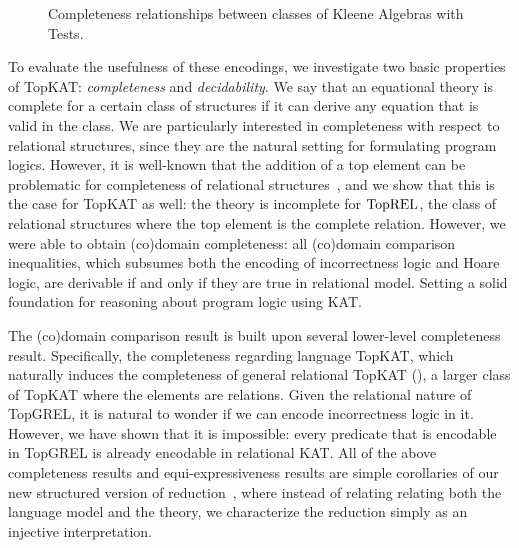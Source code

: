 
\begin{figure}
    \centering
    \caption{Completeness relationships between classes of Kleene Algebras with Tests.}\label{fig:completeness}
\end{figure}

To evaluate the usefulness of these encodings, we investigate two basic
properties of TopKAT\@: \emph{completeness} and \emph{decidability}.  We say
that an equational theory is complete for a certain class of structures if it
can derive any equation that is valid in the class.  We are particularly
interested in completeness with respect to relational structures, since they are
the natural setting for formulating program logics. 
However, it is well-known that the addition of a top element can be problematic for completeness of relational structures~\cite{pousAutomataRelationAlgebra2016}, and we show that this is the case for TopKAT as well: the theory is incomplete for \(\mathbf{\mathrm{TopREL}}\), the class of relational structures where the top element is the complete relation.  
However, we were able to obtain (co)domain completeness: all (co)domain comparison inequalities, which subsumes both the encoding of incorrectness logic and Hoare logic, are derivable if and only if they are true in relational model. Setting a solid foundation for reasoning about program logic using KAT.

The (co)domain comparison result is built upon several lower-level completeness result. Specifically, the completeness regarding language TopKAT, which naturally induces the completeness of general relational TopKAT (\TopGREL), a larger class of TopKAT where the elements are relations.
Given the relational nature of TopGREL, it is natural to wonder if we can encode incorrectness logic in it. However, we have shown that it is impossible: every predicate that is encodable in TopGREL is already encodable in relational KAT.
All of the above completeness results and equi-expressiveness results are simple corollaries of our new structured version of reduction~\cite{Pous_Rot_Wagemaker_2021}, where instead of relating relating both the language model and the theory, we characterize the reduction simply as an injective interpretation.

